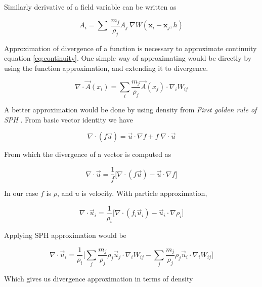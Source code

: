 Similarly derivative of a field variable can be written as

\begin{equation}
  \label{eq:discrete_derivative}
  A_i = \sum\> \frac{m_j}{\rho_j} A_j\> \nabla W(\boldsymbol{x}_i - \boldsymbol{x}_j, h)
\end{equation}

Approximation of divergence of a function is necessary to approximate
continuity equation \eqref{eq:continuity}.  One simple way of approximating would
be directly by using the function approximation, and extending it to divergence.

\begin{equation*}
  \nabla \cdot \vec{A}(x_i) = \sum_i \frac{m_j}{\rho_j}
  \vec{A}(x_j) \cdot \nabla_i W_{ij}
\end{equation*}

A better approximation would be done by using density from \textit{First golden rule
of SPH} \cite{monaghan-1992-smoot-partic-hydrod}.  From basic vector identity we
have

\begin{equation*}
  \nabla\cdot(f \vec{u}) = \vec{u} \cdot
  \nabla{f} + f \; \nabla \cdot \vec{u}
\end{equation*}

From which the divergence of a vector is computed as

\begin{equation*}
  \nabla \cdot \vec{u} = \frac{1}{f} \Big[\nabla\cdot(f
  \vec{u}) - \vec{u} \cdot \nabla{f} \Big]
\end{equation*}

In our case $f$ is $\rho$, and $u$ is velocity.  With particle
approximation,

\begin{equation*}
  \nabla \cdot \vec{u}_i = \frac{1}{\rho_i}
  \Big[\nabla\cdot(f_i \vec{u}_i) - \vec{u}_i \cdot \nabla{\rho}_i
  \Big]
\end{equation*}

Applying SPH approximation would be

\begin{equation*}
  \nabla \cdot \vec{u}_i = \frac{1}{\rho_i} \Big[
  \sum_j \frac{m_j}{\rho_j} \rho_j \vec{u}_j \cdot \nabla_i W_{ij} - \sum_j
  \frac{m_j}{\rho_j} \rho_j \vec{u}_i \cdot \nabla_i W_{ij} \Big]
\end{equation*}

Which gives us divergence approximation in terms of density

